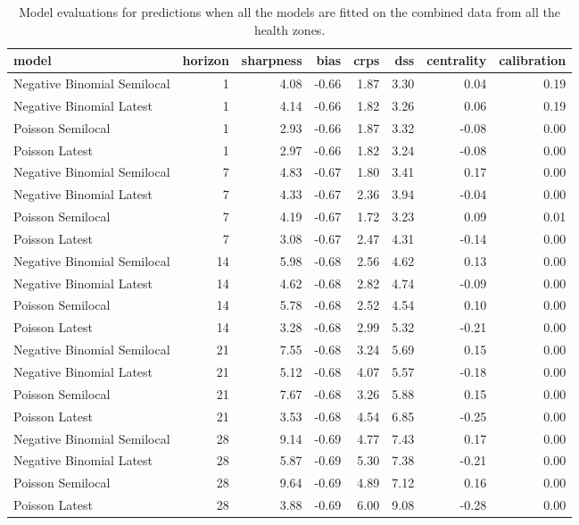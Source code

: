 \begin{table}[ht]
\centering
\begin{tabular}{lrrrrrrr}
  \hline
model & horizon & sharpness & bias & crps & dss & centrality & calibration \\ 
  \hline
Negative Binomial Semilocal &   1 & 4.08 & -0.66 & 1.87 & 3.30 & 0.04 & 0.19 \\ 
  Negative Binomial Latest &   1 & 4.14 & -0.66 & 1.82 & 3.26 & 0.06 & 0.19 \\ 
  Poisson Semilocal &   1 & 2.93 & -0.66 & 1.87 & 3.32 & -0.08 & 0.00 \\ 
  Poisson Latest &   1 & 2.97 & -0.66 & 1.82 & 3.24 & -0.08 & 0.00 \\ 
  Negative Binomial Semilocal &   7 & 4.83 & -0.67 & 1.80 & 3.41 & 0.17 & 0.00 \\ 
  Negative Binomial Latest &   7 & 4.33 & -0.67 & 2.36 & 3.94 & -0.04 & 0.00 \\ 
  Poisson Semilocal &   7 & 4.19 & -0.67 & 1.72 & 3.23 & 0.09 & 0.01 \\ 
  Poisson Latest &   7 & 3.08 & -0.67 & 2.47 & 4.31 & -0.14 & 0.00 \\ 
  Negative Binomial Semilocal &  14 & 5.98 & -0.68 & 2.56 & 4.62 & 0.13 & 0.00 \\ 
  Negative Binomial Latest &  14 & 4.62 & -0.68 & 2.82 & 4.74 & -0.09 & 0.00 \\ 
  Poisson Semilocal &  14 & 5.78 & -0.68 & 2.52 & 4.54 & 0.10 & 0.00 \\ 
  Poisson Latest &  14 & 3.28 & -0.68 & 2.99 & 5.32 & -0.21 & 0.00 \\ 
  Negative Binomial Semilocal &  21 & 7.55 & -0.68 & 3.24 & 5.69 & 0.15 & 0.00 \\ 
  Negative Binomial Latest &  21 & 5.12 & -0.68 & 4.07 & 5.57 & -0.18 & 0.00 \\ 
  Poisson Semilocal &  21 & 7.67 & -0.68 & 3.26 & 5.88 & 0.15 & 0.00 \\ 
  Poisson Latest &  21 & 3.53 & -0.68 & 4.54 & 6.85 & -0.25 & 0.00 \\ 
  Negative Binomial Semilocal &  28 & 9.14 & -0.69 & 4.77 & 7.43 & 0.17 & 0.00 \\ 
  Negative Binomial Latest &  28 & 5.87 & -0.69 & 5.30 & 7.38 & -0.21 & 0.00 \\ 
  Poisson Semilocal &  28 & 9.64 & -0.69 & 4.89 & 7.12 & 0.16 & 0.00 \\ 
  Poisson Latest &  28 & 3.88 & -0.69 & 6.00 & 9.08 & -0.28 & 0.00 \\ 
   \hline
\end{tabular}
\caption{Model evaluations for predictions when all the models are fitted on the combined data from all the health zones.} 
\label{tab:nat_evo}
\end{table}
